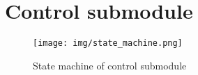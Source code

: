 \section{Control submodule}

\begin{figure}[h]
    \centering
    \texttt{[image: img/state\_machine.png]}
    \caption{State machine of control submodule}
    \label{fig:state_machine}
\end{figure}

